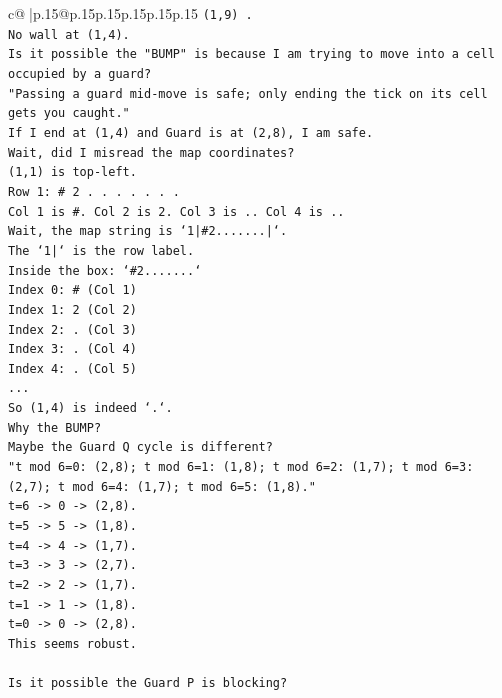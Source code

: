 \documentclass{article}
\begin{document}
{\begin{supertabular}{c@{$\;$}|p{.15\linewidth}@{}p{.15\linewidth}p{.15\linewidth}p{.15\linewidth}p{.15\linewidth}p{.15\linewidth}}
{{{\texttt{(1,9) .} \\
\texttt{No wall at (1,4).} \\
\texttt{Is it possible the "BUMP" is because I am trying to move into a cell occupied by a guard?} \\
\texttt{"Passing a guard mid{-}move is safe; only ending the tick on its cell gets you caught."} \\
\texttt{If I end at (1,4) and Guard is at (2,8), I am safe.} \\
\texttt{Wait, did I misread the map coordinates?} \\
\texttt{(1,1) is top{-}left.} \\
\texttt{Row 1: \# 2 . . . . . . .} \\
\texttt{Col 1 is \#. Col 2 is 2. Col 3 is .. Col 4 is ..} \\
\texttt{Wait, the map string is `1|\#2.......|`.} \\
\texttt{The `1|` is the row label.} \\
\texttt{Inside the box: `\#2.......`} \\
\texttt{Index 0: \# (Col 1)} \\
\texttt{Index 1: 2 (Col 2)} \\
\texttt{Index 2: . (Col 3)} \\
\texttt{Index 3: . (Col 4)} \\
\texttt{Index 4: . (Col 5)} \\
\texttt{...} \\
\texttt{So (1,4) is indeed `.`.} \\
\texttt{Why the BUMP?} \\
\texttt{Maybe the Guard Q cycle is different?} \\
\texttt{"t mod 6=0: (2,8); t mod 6=1: (1,8); t mod 6=2: (1,7); t mod 6=3: (2,7); t mod 6=4: (1,7); t mod 6=5: (1,8)."} \\
\texttt{t=6 {-}> 0 {-}> (2,8).} \\
\texttt{t=5 {-}> 5 {-}> (1,8).} \\
\texttt{t=4 {-}> 4 {-}> (1,7).} \\
\texttt{t=3 {-}> 3 {-}> (2,7).} \\
\texttt{t=2 {-}> 2 {-}> (1,7).} \\
\texttt{t=1 {-}> 1 {-}> (1,8).} \\
\texttt{t=0 {-}> 0 {-}> (2,8).} \\
\texttt{This seems robust.} \\
\\ 
\texttt{Is it possible the Guard P is blocking?} \\
}}}
\end{supertabular}}
\end{document}
